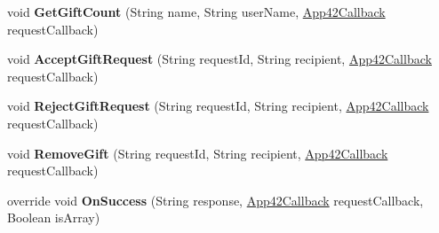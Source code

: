 \begin{DoxyCompactItemize}
\item 
\hypertarget{classcom_1_1shephertz_1_1app42_1_1paas_1_1sdk_1_1windows_1_1gift_1_1_gift_service_ab929b769a714502a3e8489047dfc54a7}{void {\bfseries Get\+Gift\+Count} (String name, String user\+Name, \hyperlink{interfacecom_1_1shephertz_1_1app42_1_1paas_1_1sdk_1_1windows_1_1_app42_callback}{App42\+Callback} request\+Callback)}\label{classcom_1_1shephertz_1_1app42_1_1paas_1_1sdk_1_1windows_1_1gift_1_1_gift_service_ab929b769a714502a3e8489047dfc54a7}

\item 
\hypertarget{classcom_1_1shephertz_1_1app42_1_1paas_1_1sdk_1_1windows_1_1gift_1_1_gift_service_a6de71b165214584d92e2c72c7d26c5ce}{void {\bfseries Accept\+Gift\+Request} (String request\+Id, String recipient, \hyperlink{interfacecom_1_1shephertz_1_1app42_1_1paas_1_1sdk_1_1windows_1_1_app42_callback}{App42\+Callback} request\+Callback)}\label{classcom_1_1shephertz_1_1app42_1_1paas_1_1sdk_1_1windows_1_1gift_1_1_gift_service_a6de71b165214584d92e2c72c7d26c5ce}

\item 
\hypertarget{classcom_1_1shephertz_1_1app42_1_1paas_1_1sdk_1_1windows_1_1gift_1_1_gift_service_abc04a2b3bc9a3595c4f3fb2026df4810}{void {\bfseries Reject\+Gift\+Request} (String request\+Id, String recipient, \hyperlink{interfacecom_1_1shephertz_1_1app42_1_1paas_1_1sdk_1_1windows_1_1_app42_callback}{App42\+Callback} request\+Callback)}\label{classcom_1_1shephertz_1_1app42_1_1paas_1_1sdk_1_1windows_1_1gift_1_1_gift_service_abc04a2b3bc9a3595c4f3fb2026df4810}

\item 
\hypertarget{classcom_1_1shephertz_1_1app42_1_1paas_1_1sdk_1_1windows_1_1gift_1_1_gift_service_a866cf71fed0b8340575bf66a67e129e3}{void {\bfseries Remove\+Gift} (String request\+Id, String recipient, \hyperlink{interfacecom_1_1shephertz_1_1app42_1_1paas_1_1sdk_1_1windows_1_1_app42_callback}{App42\+Callback} request\+Callback)}\label{classcom_1_1shephertz_1_1app42_1_1paas_1_1sdk_1_1windows_1_1gift_1_1_gift_service_a866cf71fed0b8340575bf66a67e129e3}

\item 
\hypertarget{classcom_1_1shephertz_1_1app42_1_1paas_1_1sdk_1_1windows_1_1gift_1_1_gift_service_a6e68ce5731a822f34e1a500e8fbe5115}{override void {\bfseries On\+Success} (String response, \hyperlink{interfacecom_1_1shephertz_1_1app42_1_1paas_1_1sdk_1_1windows_1_1_app42_callback}{App42\+Callback} request\+Callback, Boolean is\+Array)}\label{classcom_1_1shephertz_1_1app42_1_1paas_1_1sdk_1_1windows_1_1gift_1_1_gift_service_a6e68ce5731a822f34e1a500e8fbe5115}


\end{DoxyCompactItemize}
